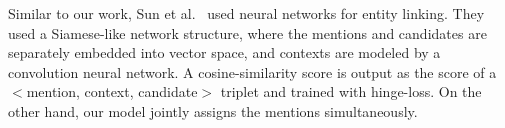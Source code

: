 Similar to our work, Sun et al.~ used neural networks for entity linking. They used a Siamese-like network structure, where the mentions and candidates are separately embedded into vector space,  and contexts are modeled by a convolution neural network. 
A cosine-similarity score is output as the score of a $<$mention, context, candidate$>$ triplet and trained with hinge-loss. On the other hand, our model jointly assigns the mentions simultaneously.

